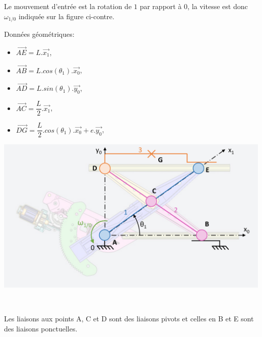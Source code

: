 \begin{minipage}{0.38\linewidth}
Le mouvement d'entrée est la rotation de $1$ par rapport à $0$, la vitesse est donc $\omega_{1/0}$ indiquée sur la figure ci-contre.

Données géométriques:
\begin{itemize}
 \item $\overrightarrow{AE}=L.\overrightarrow{x_1}$,
 \item $\overrightarrow{AB}=L.cos(\theta_1).\overrightarrow{x_0}$,
 \item $\overrightarrow{AD}=L.sin(\theta_1).\overrightarrow{y_0}$,
 \item $\overrightarrow{AC}=\dfrac{L}{2}.\overrightarrow{x_1}$,
 \item $\overrightarrow{DG}=\dfrac{L}{2}.cos(\theta_1).\overrightarrow{x_0}+e.\overrightarrow{y_0}$,
\end{itemize}
\end{minipage}
\hfill
\begin{minipage}{0.58\linewidth}
 \centering\includegraphics[width=0.9\linewidth]{img/leve_vitre}
\end{minipage}

~\

Les liaisons aux points A, C et D sont des liaisons pivots et celles en B et E sont des liaisons ponctuelles.



